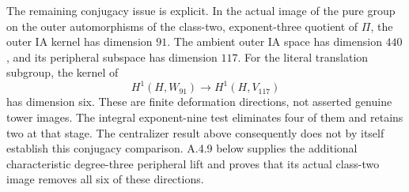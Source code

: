 The remaining conjugacy issue is explicit.  In the actual image of
the pure group on the outer automorphisms of the class-two,
exponent-three quotient of $\Pi$, the outer IA kernel has dimension
$91$.  The ambient outer IA space has dimension $440$, and its
peripheral subspace has dimension $117$.  For the literal translation
subgroup, the kernel of
\[
 H^1(H,W_{91})\longrightarrow H^1(H,V_{117})
\]
has dimension six.  These are finite deformation directions, not
asserted genuine tower images.  The integral exponent-nine test
eliminates four of them and retains two at that stage.  The
centralizer result above consequently does not by itself establish
this conjugacy comparison.  A.4.9 below supplies the additional
characteristic degree-three peripheral lift and proves that its
actual class-two image removes all six of these directions.
